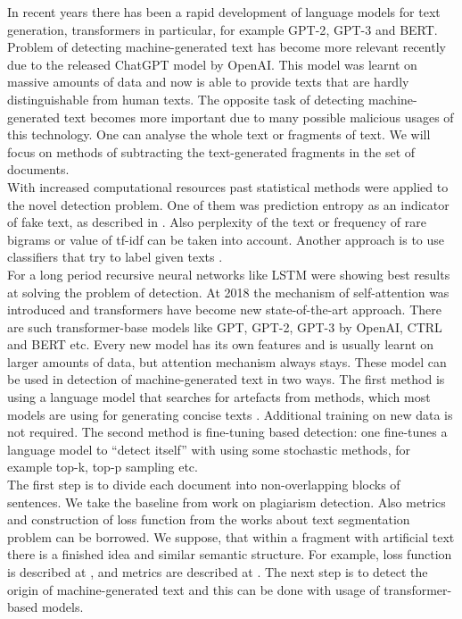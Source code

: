 \documentclass{article}
\begin{document}
In recent years there has been a rapid development of language models for text generation, transformers in particular, for example GPT-2\cite{gpt2}, GPT-3\cite{gpt3} and BERT\cite{bert}. Problem of detecting machine-generated text has become more relevant recently due to the released ChatGPT model by OpenAI. This model was learnt on massive amounts of data and now is able to provide texts that are hardly distinguishable from human texts. The opposite task of detecting machine-generated text becomes more important due to many possible malicious usages of this technology. One can analyse the whole text or fragments of text.
We will focus on methods of subtracting the text-generated fragments in the set of documents.\\
With increased computational resources past statistical methods were applied to the novel detection problem. One of them was prediction entropy as an indicator of fake text, as described in \cite{relativeentropy}. Also perplexity\cite{perplexity} of the text or frequency of rare bigrams \cite{rare_bigrams} or value of tf-idf \cite{solaiman} can be taken into account. Another approach is to use classifiers that try to label given texts \cite{Kuznetsov}.\\
For a long period recursive neural networks like LSTM were showing best results at solving the problem of detection. At 2018 the mechanism of self-attention\cite{Vaswani} was introduced and transformers have become new state-of-the-art approach. There are such transformer-base models like GPT\cite{gpt}, GPT-2\cite{gpt2}, GPT-3\cite{gpt3} by OpenAI, CTRL\cite{ctrl} and BERT\cite{bert} etc. Every new model has its own features and is usually learnt on larger amounts of data, but attention mechanism always stays. These model can be used in detection of machine-generated text in two ways\cite{solaiman}. The first method is using a language model that searches for artefacts from  methods, which most models are using for generating concise texts \cite{gltr}. Additional training on new data is not required. The second method is fine-tuning based detection: one fine-tunes a language model to “detect itself” with using some stochastic methods, for example top-k, top-p sampling etc.\\
The first step is to divide each document into non-overlapping blocks of sentences. We take the baseline from work\cite{Kuznetsov} on plagiarism detection. Also metrics and construction of loss function from the works about text segmentation problem can be borrowed. We suppose, that within a fragment with artificial text there is a finished idea and similar semantic structure. For example, loss function is described at \cite{ts_loss}, and metrics are described at \cite{ts_metrics}. The next step is to detect the origin of machine-generated text and this can be done with usage of transformer-based models. 
 
\end{document}
